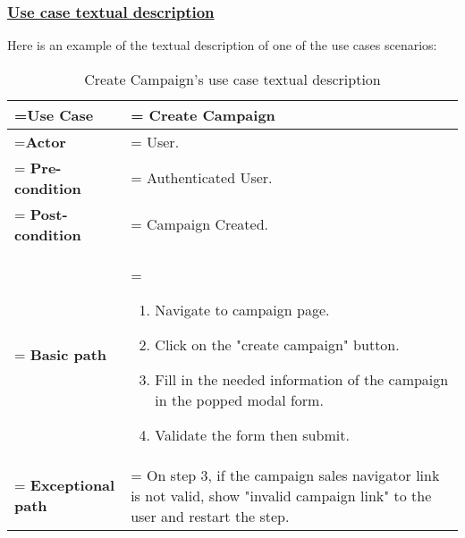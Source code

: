\subsubsection{\underline{Use case textual description}}
Here is an example of the textual description of one of the use cases scenarios:
\begin{table}[H]
    \renewcommand{\arraystretch}{1.5}%
    \caption{Create Campaign's use case textual description}
    \centering
    \medskip
    \begin{tabularx}{1\textwidth} {
            | >{\hsize=0.5\hsize\linewidth=\hsize\centering\arraybackslash}X
            | >{\hsize=1.5\hsize\linewidth=\hsize\justifying\arraybackslash}X |}
        \hline
        \textbf {Use Case}         & \noindent Create Campaign                                                                                                              \\
        \hline
        \textbf {Actor}            & \noindent User.                                                                                                                        \\
        \hline
        \textbf {Pre-condition}    & \noindent Authenticated User.                                                                                                          \\
        \hline
        \textbf {Post-condition}   & \noindent Campaign Created.                                                                                                            \\
        \hline
        \textbf {Basic path}       & \noindent    \begin{enumerate}
            \item Navigate to campaign page.
            \item Click on the "create campaign" button.
            \item Fill in the needed information of the campaign in the popped modal form.
            \item Validate the form then submit.
        \end{enumerate}                                                                                                 \\
        \hline
        \textbf {Exceptional path} & \noindent On step 3, if the campaign sales navigator link is not valid, show "invalid campaign link" to the user and restart the step. \\
        \hline
    \end{tabularx}
\end{table}

